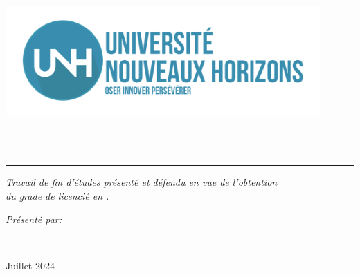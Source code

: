 \begin{titlepage}
    \begin{center}
        \large
        
        \vspace*{.03\textheight}
        \includegraphics[width=12cm]{Images/logo_unh} \\[0.75cm]
        
        {\LARGE{{\textsc{\myFaculty}}} }\\[0.2cm]
        
        {\LARGE{{{\myDepartment}}} }\\
        \medskip %
        
        \vspace{2.5cm} 
        \begin{center}
            \rule{0.9\textwidth}{.2pt}
        \end{center}
        \vspace{0.2cm}
        
        {\LARGE \bfseries {\myTitle}}
        
        \begin{center}
            \rule{0.9\textwidth}{.2pt}
        \end{center}

        \begin{flushright}
            {\slshape \textit{Travail de fin d’études présenté et défendu en vue de l’obtention\\ du grade de licencié en \myFaculty.}}\\[2cm] 
        \end{flushright}
        
        \begin{minipage}[t]{0.55\textwidth}
            \begin{flushright}
                \large
                \emph{Présenté par:} \textbf{{\myName}}
            \end{flushright}
        \end{minipage}\\[3cm]
        \vfill
        
        {\large Juillet 2024}\\
    \end{center}
\end{titlepage}
